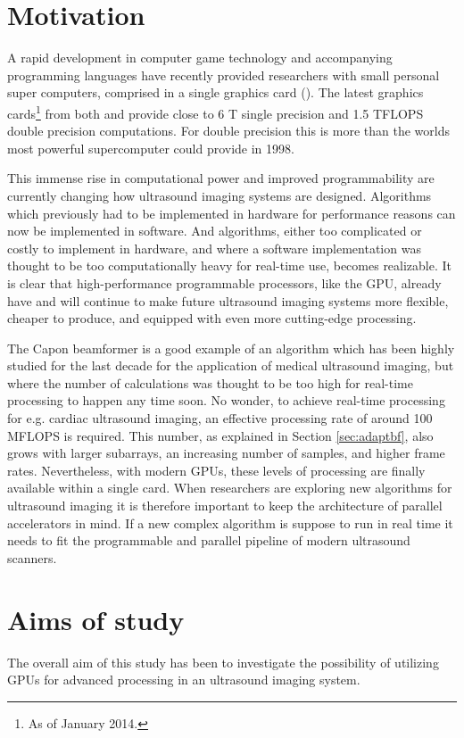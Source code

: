 \section{Motivation}
A rapid development in computer game technology and accompanying programming languages have recently provided researchers with small personal super computers, comprised in a single graphics card (). The latest graphics cards\footnote{As of January 2014.} from both  and  provide close to 6 T single precision and 1.5 TFLOPS double precision computations. For double precision this is more than the worlds most powerful supercomputer could provide in 1998.

This immense rise in computational power and improved programmability are currently changing how ultrasound imaging systems are designed. Algorithms which previously had to be implemented in hardware for performance reasons can now be implemented in software. And algorithms, either too complicated or costly to implement in hardware, and where a software implementation was thought to be too computationally heavy for real-time use, becomes realizable. It is clear that high-performance programmable processors, like the GPU, already have and will continue to make future ultrasound imaging systems more flexible, cheaper to produce, and equipped with even more cutting-edge processing.

The Capon beamformer  is a good example of an algorithm which has been highly studied for the last decade for the application of medical ultrasound imaging, but where the number of calculations was thought to be too high for real-time processing to happen any time soon. No wonder, to achieve real-time processing for e.g. cardiac ultrasound imaging, an effective processing rate of around 100 MFLOPS is required. This number, as explained in Section \ref{sec:adaptbf}, also grows with larger subarrays, an increasing number of samples, and higher frame rates.  Nevertheless, with modern GPUs, these levels of processing are finally available within a single card. When researchers are exploring new algorithms for ultrasound imaging it is therefore important to keep the architecture of parallel accelerators in mind. If a new complex algorithm is suppose to run in real time it needs to fit the programmable and parallel pipeline of modern ultrasound scanners.

\section{Aims of study}
The overall aim of this study has been to investigate the possibility of utilizing GPUs for advanced processing in an ultrasound imaging system. 

